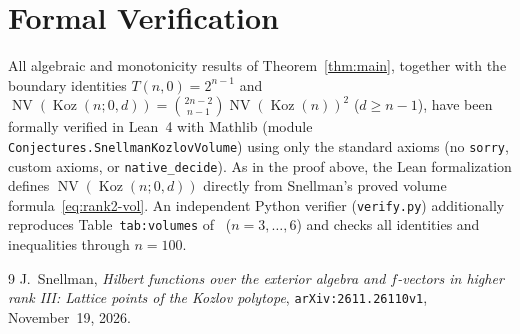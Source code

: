 \documentclass[11pt]{article}
\theoremstyle{remark}
\DeclareMathOperator{\NV}{NV}
\DeclareMathOperator{\Koz}{Koz}
\begin{document}
\section{Formal Verification}

All algebraic and monotonicity results of Theorem~\ref{thm:main}, together with the boundary identities $T(n, 0) = 2^{n-1}$ and $\NV(\Koz(n; 0, d)) = \binom{2n-2}{n-1}\NV(\Koz(n))^2$ ($d \ge n - 1$), have been formally verified in Lean~4 with Mathlib (module \texttt{Conjectures.SnellmanKozlovVolume}) using only the standard axioms (no \texttt{sorry}, custom axioms, or \texttt{native\_decide}). As in the proof above, the Lean formalization defines $\NV(\Koz(n; 0, d))$ directly from Snellman's proved volume formula~\eqref{eq:rank2-vol}. An independent Python verifier (\texttt{verify.py}) additionally reproduces Table~\texttt{tab:volumes} of~\cite{Snellman2026} ($n = 3, \dots, 6$) and checks all identities and inequalities through $n = 100$.

\begin{thebibliography}{9}
J.~Snellman,
\emph{Hilbert functions over the exterior algebra and $f$-vectors in higher rank III: Lattice points of the Kozlov polytope},
\texttt{arXiv:2611.26110v1}, November~19, 2026.
\end{thebibliography}
\end{document}
